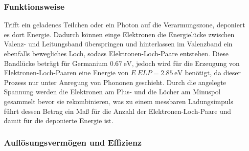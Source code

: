 \subsubsection{Funktionsweise}

Trifft ein geladenes Teilchen oder ein Photon auf die Verarmungszone, deponiert es dort Energie. Dadurch können einge Elektronen die Energielücke zwischen Valenz- und Leitungsband überspringen und hinterlassen im Valenzband ein ebenfalls bewegliches Loch, sodass Elektronen-Loch-Paare entstehen. Diese Bandlücke beträgt für Germanium $\SI{0,67}{\electronvolt}$, jedoch wird für die Erzeugung von Elektronen-Loch-Paaren eine Energie von $E_.{ELP}=\SI{2,85}{\electronvolt}$\cite{Spektrum18} benötigt, da dieser Prozess nur unter Anregung von Phononen geschieht. Durch die angelegte Spannung werden die Elektronen am Plus- und die Löcher am Minuspol gesammelt bevor sie rekombinieren, was zu einem messbaren Ladungsimpuls führt dessen Betrag ein Maß für die Anzahl der Elektronen-Loch-Paare und damit für die deponierte Energie ist.

\subsubsection{Auflösungsvermögen und Effizienz}

